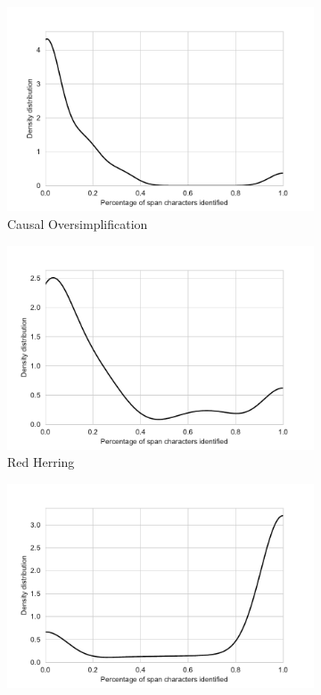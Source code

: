 \documentclass[11pt]{article}
\begin{document}
\begin{figure}[h]
    \centering
    \begin{subfigure}{0.23\textwidth}
        \centering
        \includegraphics[width=\linewidth]{images/Causal_Oversimplification.pdf}
        \caption{Causal Oversimplification}
        \label{subfigure:oversim}
    \end{subfigure}
    \begin{subfigure}{0.23\textwidth}
        \centering
        \includegraphics[width=\linewidth]{images/Red_Herring.pdf}
        \caption{Red Herring}
        \label{subfigure:red}
    \end{subfigure}
    \begin{subfigure}{0.23\textwidth}
        \centering
        \includegraphics[width=\linewidth]{images/Loaded_Language.pdf}

\end{subfigure}
\end{figure}
\end{document}
